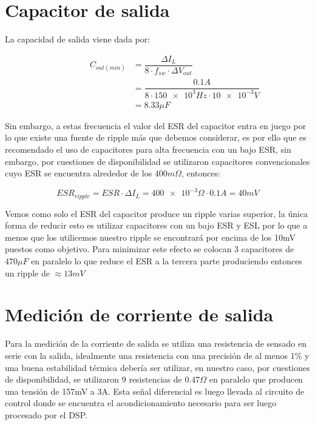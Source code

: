 \documentclass[12pt]{report}
\begin{document}
\section{Capacitor de salida}

	La capacidad de salida viene dada por:

	\begin{equation}
		\begin{aligned}
		\qquad \qquad C_{out(min)} &= \dfrac{\Delta I_L}{8 \cdot f_{sw} \cdot \Delta V_{out}} \\
		& = \dfrac{0.1A}{8 \cdot \num{150e3}Hz \cdot \num{10e-3}V} \\
		& = 8.33 \mu F
		\end{aligned}
	\end{equation}

	Sin embargo, a estas frecuencia el valor del ESR del capacitor entra en juego por lo que existe una fuente de ripple más que debemos considerar, es por ello que es recomendado el uso de capacitores para alta frecuencia con un bajo ESR, sin embargo, por cuestiones de disponibilidad se utilizaron capacitores convencionales cuyo ESR se encuentra alrededor de los $400 m\Omega$, entonces:
	
	\begin{equation}
		ESR_{ripple} = ESR \cdot \Delta I_L = \num{400e-3}\Omega \cdot 0.1A = 40mV
	\end{equation}
	
	Vemos como solo el ESR del capacitor produce un ripple varias superior, la única forma de reducir esto es utilizar capacitores con un bajo ESR y ESL por lo que a menos que los utilicemos nuestro ripple se encontrará por encima de los 10mV puestos como objetivo. Para minimizar este efecto se colocan 3 capacitores de $470\mu F$ en paralelo lo que reduce el ESR a la tercera parte produciendo entonces un ripple de $\approx 13mV$
	
\section{Medición de corriente de salida}

	Para la medición de la corriente de salida se utiliza una resistencia de sensado en serie con la salida, idealmente una resistencia con una precisión de al menos 1\% y una buena estabilidad térmica debería ser utilizar, en nuestro caso, por cuestiones de disponibilidad, se utilizaron 9 resistencias de $0.47\Omega$ en paralelo que producen una tensión de 157mV a 3A. Esta señal diferencial es luego llevada al circuito de control donde se encuentra el acondicionamiento necesario para ser luego procesado por el DSP.
\end{document}
